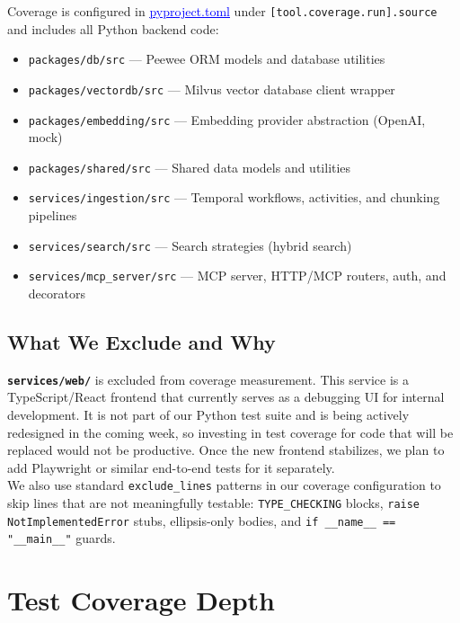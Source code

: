 \documentclass[a4paper,12pt]{article}
\newcommand{\bluehref}[2]{\href{#1}{\textcolor{blue}{\uline{#2}}}}
\begin{document}
Coverage is configured in
\bluehref{https://github.com/UofT-CSC490-W2026/Lighthouse/blob/a5/pyproject.toml}{pyproject.toml}
under \texttt{[tool.coverage.run].source} and includes all Python backend code:

\begin{itemize}
  \item \texttt{packages/db/src} --- Peewee ORM models and database utilities
  \item \texttt{packages/vectordb/src} --- Milvus vector database client wrapper
  \item \texttt{packages/embedding/src} --- Embedding provider abstraction (OpenAI, mock)
  \item \texttt{packages/shared/src} --- Shared data models and utilities
  \item \texttt{services/ingestion/src} --- Temporal workflows, activities, and chunking pipelines
  \item \texttt{services/search/src} --- Search strategies (hybrid search)
  \item \texttt{services/mcp\_server/src} --- MCP server, HTTP/MCP routers, auth, and decorators
\end{itemize}

\subsection{What We Exclude and Why}

\textbf{\texttt{services/web/}} is excluded from coverage measurement. This service is a
TypeScript/React frontend that currently serves as a debugging UI for internal development.
It is not part of our Python test suite and is being actively redesigned in the coming week,
so investing in test coverage for code that will be replaced would not be productive.
Once the new frontend stabilizes, we plan to add Playwright or similar end-to-end tests
for it separately.\\

We also use standard \texttt{exclude\_lines} patterns in our coverage configuration to
skip lines that are not meaningfully testable: \texttt{TYPE\_CHECKING} blocks,
\texttt{raise NotImplementedError} stubs, ellipsis-only bodies, and
\texttt{if \_\_name\_\_ == "\_\_main\_\_"} guards.

\newpage
\section{Test Coverage Depth}
\end{document}
